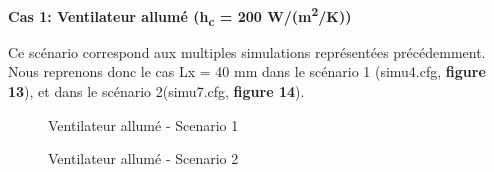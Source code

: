 \documentclass[11pt]{article} %
\begin{document}
		\begin{center}
			\bf{Cas 1: Ventilateur allumé (h\textsubscript c = 200 W/(m\textsuperscript2/K))}
		\end{center}
\par Ce scénario correspond aux multiples simulations représentées précédemment. Nous reprenons donc le cas Lx = 40 mm dans le scénario 1 (simu4\textunderscore.cfg, \textbf{figure 13}), et dans le scénario 2(simu\textunderscore7.cfg, \textbf{figure 14}).
			\begin{figure}[!htb]
				\centering
				\qquad
				\caption{Ventilateur allumé - Scenario 1}%

				\centering
				\qquad
				\caption{Ventilateur allumé - Scenario 2}%
			\end{figure}
\end{document}
